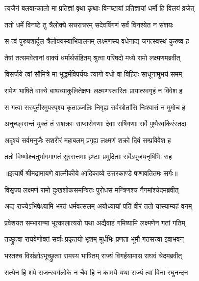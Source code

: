 \twolineshloka
{त्यजैनं बलवान्कालो मा प्रतिज्ञां वृथा कृथाः}
{विनष्टायां प्रतिज्ञायां धर्मो हि विलयं व्रजेत्} %

\twolineshloka
{ततो धर्मे विनष्टे तु त्रैलोक्ये सचराचरम्}
{सदेवर्षिगणं सर्वं विनश्येत न संशयः} %

\twolineshloka
{स त्वं पुरुषशार्दूल त्रैलोक्यस्याभिपालनम्}
{लक्ष्मणस्य वधेनाद्य जगत्स्वस्थं कुरुष्व ह} %

\twolineshloka
{तेषां तत्समवेतानां वाक्यं धर्मार्थसंहितम्}
{श्रुत्वा परिषदो मध्ये रामो लक्ष्मणमब्रवीत्} %

\twolineshloka
{विसर्जये त्वां सौमित्रे मा भूद्धर्मविपर्ययः}
{त्यागो वधो वा विहितः साधूनामुभयं समम्} %

\twolineshloka
{रामेण भाषिते वाक्ये बाष्पव्याकुलितेक्षणः}
{लक्ष्मणस्त्वरितः प्रायात्स्वगृहं न विवेश ह} %

\twolineshloka
{स गत्वा सरयूतीरमुपस्पृश्य कृताञ्जलिः}
{निगृह्य सर्वस्रोतांसि निःश्वासं न मुमोच ह} %

\twolineshloka
{अनुच्छ्वसन्तं युक्तं तं सशक्राः साप्सरोगणाः}
{देवाः सर्षिगणाः सर्वे पुष्पैरवकिरंस्तदा} %

\twolineshloka
{अदृश्यं सर्वमनुजैः सशरीरं महाबलम्}
{प्रगृह्य लक्ष्मणं शक्रो दिवं सम्प्रविवेश ह} %

\twolineshloka
{ततो विष्णोश्चतुर्भागमागतं सुरसत्तमाः}
{हृष्टाः प्रमुदिताः सर्वेऽपूजयनृषिभिः सह} %


{॥इत्यार्षे श्रीमद्रामायणे वाल्मीकीये आदिकाव्ये उत्तरकाण्डे षण्णवतितमः सर्गः॥}


\twolineshloka
{विसृज्य लक्ष्मणं रामो दुःखशोकसमन्वितः}
{पुरोधसं मन्त्रिणश्च नैगमांश्चेदमब्रवीत्} %

\twolineshloka
{अद्य राज्येऽभिषेक्ष्यामि भरतं धर्मवत्सलम्}
{अयोध्यायां पतिं वीरं ततो यास्याम्यहं वनम्} %

\twolineshloka
{प्रवेशयत सम्भारान्मा भूत्कालात्ययो यथा}
{अद्यैवाहं गमिष्यामि लक्ष्मणेन गतां गतिम्} %

\twolineshloka
{तच्छ्रुत्वा राघवेणोक्तं सर्वाः प्रकृतयो भृशम्}
{मूर्धभिः प्रणता भूमौ गतसत्त्वा इवाभवन्} %

\twolineshloka
{भरतश्च विसंज्ञोऽभूच्छ्रुत्वा रामस्य भाषितम्}
{राज्यं विगर्हयामास राघवं चेदमब्रवीत्} %

\twolineshloka
{सत्येन हि शपे राजन्स्वर्गलोके न चैव हि}
{न कामये यथा राज्यं त्वां विना रघुनन्दन} %

